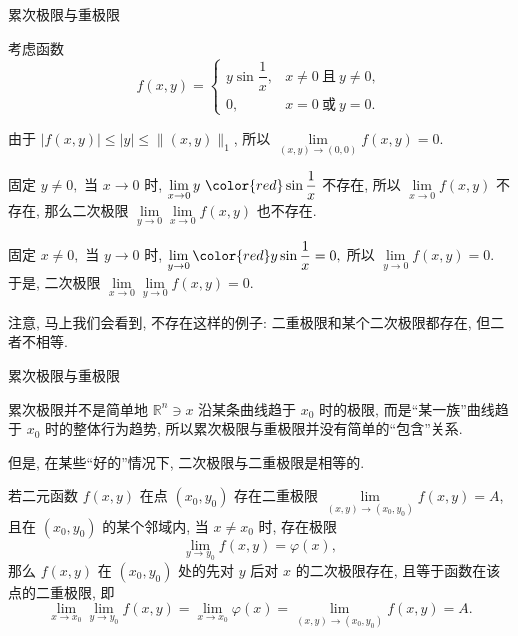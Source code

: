 
\begin{frame}{累次极限与重极限}

\begin{eg}
考虑函数
\[f(x, y) = \begin{cases}
y \sin\dfrac{1}{x}, & x \neq 0 ~ \text{且} ~ y \neq 0, \\
0, & x = 0 ~ \text{或} ~ y = 0.
\end{cases}\]

\pause

由于 $\lvert f(x, y) \rvert \leqslant \lvert y \rvert \leqslant \lVert (x, y) \rVert_1$, 所以 $\lim\limits_{(x,y) \to (0,0)} f(x, y) = 0.$

\pause
\vspace{0.5em}

固定 $y \neq 0,$ 当 $x \to 0$ 时, $\lim\limits_{x \to 0} y ~ {\color{red}\sin\dfrac{1}{x}}$ 不存在, 所以 $\lim\limits_{x \to 0} f(x, y)$ 不存在, 那么二次极限 $\lim\limits_{y \to 0} \lim\limits_{x \to 0} f(x, y)$ 也不存在.

\pause
\vspace{0.5em}

固定 $x \neq 0,$ 当 $y \to 0$ 时, $\lim\limits_{y \to 0} {\color{red}y} \sin\dfrac{1}{x} = 0,$ 所以 $\lim\limits_{y \to 0} f(x, y) = 0.$ 于是, 二次极限 $\lim\limits_{x \to 0} \lim\limits_{y \to 0} f(x, y) = 0.$

\end{eg}

\pause
\vspace{0.5em}

{\color{red}注意}, 马上我们会看到, {\color{red}不存在}这样的例子: 二重极限和某个二次极限都存在, 但二者不相等.

\end{frame}


\begin{frame}{累次极限与重极限}

累次极限并不是简单地 $\mathbb{R}^n \ni x$ 沿某条曲线趋于 $x_0$ 时的极限, 而是``某一族''曲线趋于 $x_0$ 时的整体行为趋势, 所以累次极限与重极限并没有简单的``包含''关系.

\pause
\vspace{1em}

但是, 在某些``好的''情况下, 二次极限与二重极限是相等的.

\pause

\begin{thm}
若二元函数 $f(x, y)$ 在点 $(x_0, y_0)$ 存在二重极限 $\lim\limits_{(x,y) \to (x_0, y_0)} f(x, y) = A$, 且在 $(x_0, y_0)$ 的某个邻域内, 当 $x \neq x_0$ 时, 存在极限
\[\lim_{y \to y_0} f(x, y) = \varphi(x),\]
那么 $f(x, y)$ 在 $(x_0, y_0)$ 处的先对 $y$ 后对 $x$ 的二次极限存在, 且等于函数在该点的二重极限, 即
\[\lim_{x \to x_0} \lim_{y \to y_0} f(x, y) = \lim_{x \to x_0} \varphi(x) = \lim_{(x,y) \to (x_0, y_0)} f(x, y) = A.\]
\end{thm}

\end{frame}

